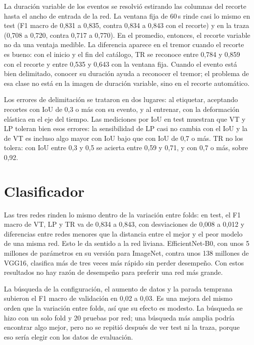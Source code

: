La duración variable de los eventos se resolvió estirando las columnas del
recorte hasta el ancho de entrada de la red. La ventana fija de 60\,s rinde
casi lo mismo en test (F1 macro de 0,831 a 0,835, contra 0,834 a 0,843 con el
recorte) y en la traza (0,708 a 0,720, contra 0,717 a 0,770). En el promedio,
entonces, el recorte variable no da una ventaja medible. La diferencia
aparece en el tremor cuando el recorte es bueno: con el inicio y el fin del
catálogo, TR se reconoce entre 0,784 y 0,859 con el recorte y entre 0,535 y
0,643 con la ventana fija. Cuando el evento está bien delimitado, conocer su
duración ayuda a reconocer el tremor; el problema de esa clase no está en la
imagen de duración variable, sino en el recorte automático.

Los errores de delimitación se trataron en dos lugares: al etiquetar, aceptando
recortes con IoU de 0,3 o más con su evento, y al entrenar, con la deformación
elástica en el eje del tiempo. Las mediciones por IoU en test muestran que VT
y LP toleran bien esos errores: la sensibilidad de LP casi no cambia con el IoU
y la de VT es incluso algo mayor con IoU bajo que con IoU de 0,7 o más. TR no
los tolera: con IoU entre 0,3 y 0,5 se acierta entre 0,59 y 0,71, y con 0,7 o
más, sobre 0,92.

\section{Clasificador}
\label{sec:disc-clasificador}

Las tres redes rinden lo mismo dentro de la variación entre folds: en test, el
F1 macro de VT, LP y TR va de 0,834 a 0,843, con desviaciones de 0,008 a 0,012
y diferencias entre redes menores que la distancia entre el mejor y el peor
modelo de una misma red. Esto le da sentido a la red liviana. EfficientNet-B0,
con unos 5 millones de parámetros en su versión para ImageNet, contra unos 138
millones de VGG16, clasifica más de tres veces más rápido sin perder
desempeño. Con estos resultados no hay razón de desempeño para preferir una
red más grande.

La búsqueda de la configuración, el aumento de datos y la parada temprana
subieron el F1 macro de validación en 0,02 a 0,03. Es una mejora del mismo
orden que la variación entre folds, así que su efecto es modesto. La búsqueda
se hizo con un solo fold y 20 pruebas por red; una búsqueda más amplia podría
encontrar algo mejor, pero no se repitió después de ver test ni la traza,
porque eso sería elegir con los datos de evaluación.

